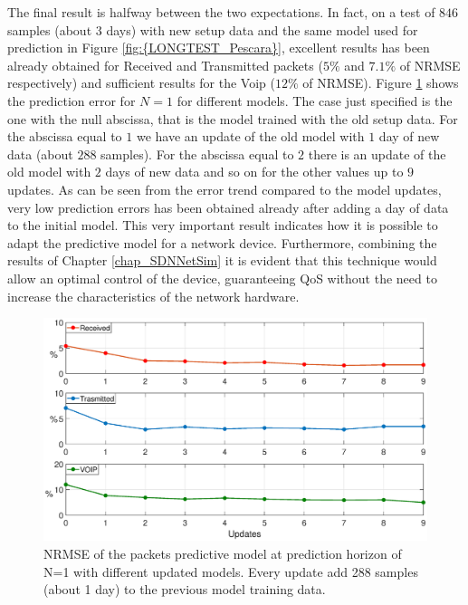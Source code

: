 The final result is halfway between the two expectations. In fact, on a test of $846$ samples (about $3$ days) with new setup data and the same model used for prediction in Figure \ref{fig:{LONGTEST_Pescara}}, excellent results has been already obtained for Received and Transmitted packets ($5\%$ and $7.1\%$ of NRMSE respectively) and sufficient results for the Voip ($12\%$ of NRMSE). Figure \ref{fig:{NEWSETUP_Pescara}} shows the prediction error for $N = 1$ for different models. The case just specified is the one with the null abscissa, that is the model trained with the old setup data. For the abscissa equal to $1$ we have an update of the old model with $1$ day of new data (about $288$ samples). For the abscissa equal to $2$ there is an update of the old model with $2$ days of new data and so on for the other values up to $9$ updates. As can be seen from the error trend compared to the model updates, very low prediction errors has been obtained already after adding a day of data to the initial model. This very important result indicates how it is possible to adapt the predictive model for a network device. Furthermore, combining the results of Chapter \ref{chap_SDNNetSim} it is evident that this technique would allow an optimal control of the device, guaranteeing QoS without the need to increase the characteristics of the network hardware.
\begin{figure}[H]
	\centering
	\includegraphics[trim={120 0 120 0}, width=1\linewidth]{figure/NEWSETUP_PESCARA.eps}
	\caption{NRMSE of the packets predictive model at prediction horizon of N=1 with different updated models. Every update add 288 samples (about 1 day) to the previous model training data.}
	\label{fig:{NEWSETUP_Pescara}}
\end{figure}